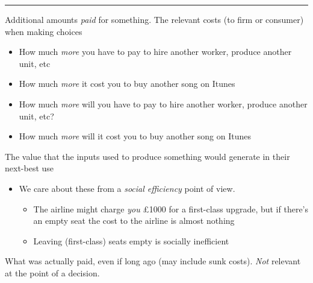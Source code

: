 \documentclass[]{article}
\providecommand{\tightlist}{%
  \setlength{\itemsep}{0pt}\setlength{\parskip}{0pt}}
\begin{document}
\begin{center}\rule{0.5\linewidth}{\linethickness}\end{center}

\begin{description}
\tightlist
\item[Economic costs (DR)]
Additional amounts \emph{paid} for something. The relevant costs (to firm or consumer) when making choices
\end{description}

\begin{itemize}
\item
  How much \emph{more} you have to pay to hire another worker, produce another unit, etc
\item
  How much \emph{more} it cost you to buy another song on Itunes
\item
  How much \emph{more} will you have to pay to hire another worker, produce another unit, etc?
\item
  How much \emph{more} will it cost you to buy another song on Itunes
\end{itemize}

\begin{description}
\tightlist
\item[Opportunity Costs]
The value that the inputs used to produce something would generate in their next-best use
\end{description}

\bigskip

\begin{itemize}
\tightlist
\item
  We care about these from a \emph{social efficiency} point of view.

  \begin{itemize}
  \tightlist
  \item
    The airline might charge \emph{you} £1000 for a first-class upgrade, but if there's an empty seat the cost to the airline is almost nothing
  \item
    Leaving (first-class) seats empty is socially inefficient
  \end{itemize}
\end{itemize}

\begin{description}
\tightlist
\item[Accounting costs]
What was actually paid, even if long ago (may include sunk costs). \emph{Not} relevant at the point of a decision.
\end{description}
\end{document}

